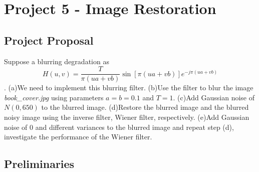 \section{Project 5 - Image Restoration}
\subsection{Project Proposal}
Suppose a blurring degradation as \begin{equation} H(u,v)=\frac{T}{\pi(ua+vb)}\sin[\pi(ua+vb)]e^{-j\pi(ua+vb)} \end{equation}. (a)We need to implement this blurring filter. (b)Use the filter to blur the image \emph{book\_cover.jpg} using parameters $a=b=0.1$ and $T=1$. (c)Add Gaussian noise of $N(0, 650)$ to the blurred image. (d)Restore the blurred image and the blurred noisy image using the inverse filter, Wiener filter, respectively. (e)Add Gaussian noise of 0 and different variances to the blurred image and repeat step (d), investigate the performance of the Wiener filter.

\subsection{Preliminaries}
